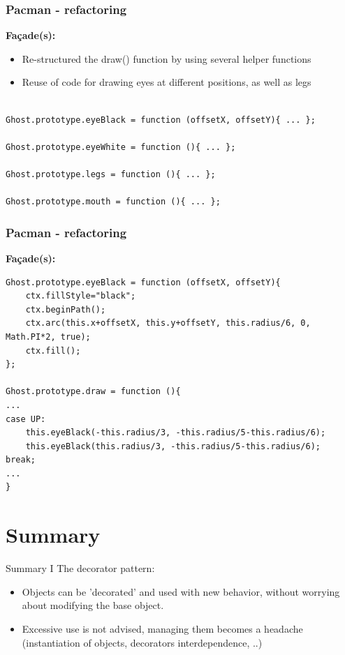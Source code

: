 \documentclass{beamer}
\begin{document}
\begin{frame}[fragile]
\frametitle{Pacman - refactoring}
\textbf{Fa\c{c}ade(s):}
   \begin{itemize}
    \item Re-structured the draw() function by using several helper functions
    \item Reuse of code for drawing eyes at different positions, as well as legs
    \end{itemize}
    \begin{lstlisting}
    
Ghost.prototype.eyeBlack = function (offsetX, offsetY){ ... };

Ghost.prototype.eyeWhite = function (){ ... };

Ghost.prototype.legs = function (){ ... };

Ghost.prototype.mouth = function (){ ... };

\end{lstlisting}
\end{frame}

\begin{frame}[fragile]
\frametitle{Pacman - refactoring}
\textbf{Fa\c{c}ade(s):}
\begin{lstlisting}
Ghost.prototype.eyeBlack = function (offsetX, offsetY){
	ctx.fillStyle="black";
	ctx.beginPath();
	ctx.arc(this.x+offsetX, this.y+offsetY, this.radius/6, 0, Math.PI*2, true); 
	ctx.fill();
};

Ghost.prototype.draw = function (){
...
case UP:
	this.eyeBlack(-this.radius/3, -this.radius/5-this.radius/6);
	this.eyeBlack(this.radius/3, -this.radius/5-this.radius/6);
break;
...
}
\end{lstlisting}
\end{frame}



\section*{Summary}
\begin{frame}{Summary I}
 The decorator pattern:
 \begin{itemize}
\item Objects can be 'decorated' and used with new behavior, without worrying about modifying the base object.
\item Excessive use is not advised, managing them becomes a headache (instantiation of objects, decorators interdependence, ..) 
 \end{itemize}
\end{frame}
\end{document}
